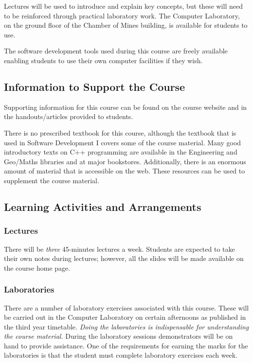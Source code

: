 \documentclass[11pt]{eie-cbo}
\begin{document}
Lectures will be used to introduce and explain key concepts, but these will
need to be reinforced through practical laboratory work. The Computer
Laboratory, on the ground floor of the Chamber of Mines building, is available for students to use. 

The software development tools used during this course are freely available enabling students to use their own computer facilities if they wish. 

\subsection{Information to Support the Course}
Supporting information for this course can be found on the course website and in the handouts/articles provided to students.

There is no prescribed textbook for this course, although the textbook that is used in Software Development I covers some of the course material. Many good introductory texts on C++ programming are available in the Engineering and \mbox{Geo/Maths} libraries and at major bookstores. Additionally, there is an enormous amount of material that is accessible on the web. These resources can be used to supplement the course material.

\subsection{Learning Activities and Arrangements}

\subsubsection{Lectures}
There will be \emph{three} 45-minutes lectures a week. Students are expected to take their own notes during lectures; however, all the slides will be made available on the course home page.

\subsubsection{Laboratories}
There are a number of laboratory exercises associated with this course. These
will be carried out in the Computer Laboratory on certain afternoons as published in the third year timetable.  \emph{Doing the laboratories is indispensable for understanding the course material.} During the laboratory sessions demonstrators will be on hand to provide assistance. One of the requirements for earning the marks for the laboratories is that the student must complete laboratory exercises each week. 
\end{document}
